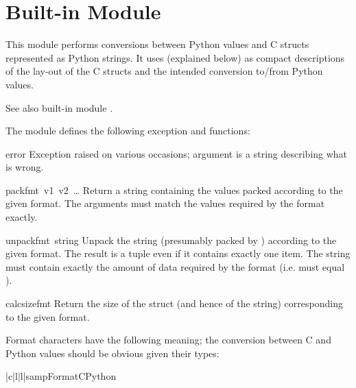 \section{Built-in Module }

This module performs conversions between Python values and C
structs represented as Python strings.  It uses 
(explained below) as compact descriptions of the lay-out of the C
structs and the intended conversion to/from Python values.

See also built-in module .

The module defines the following exception and functions:

\renewcommand{\indexsubitem}{(in module struct)}
\begin{excdesc}{error}
  Exception raised on various occasions; argument is a string
  describing what is wrong.
\end{excdesc}

\begin{funcdesc}{pack}{fmt\, v1\, v2\, {\rm \ldots}}
  Return a string containing the values
   packed according to the given
  format.  The arguments must match the values required by the format
  exactly.
\end{funcdesc}

\begin{funcdesc}{unpack}{fmt\, string}
  Unpack the string (presumably packed by )
  according to the given format.  The result is a tuple even if it
  contains exactly one item.  The string must contain exactly the
  amount of data required by the format (i.e.   must
  equal ).
\end{funcdesc}

\begin{funcdesc}{calcsize}{fmt}
  Return the size of the struct (and hence of the string)
  corresponding to the given format.
\end{funcdesc}

Format characters have the following meaning; the conversion between C
and Python values should be obvious given their types:

\begin{tableiii}{|c|l|l|}{samp}{Format}{C}{Python}
\end{tableiii}

